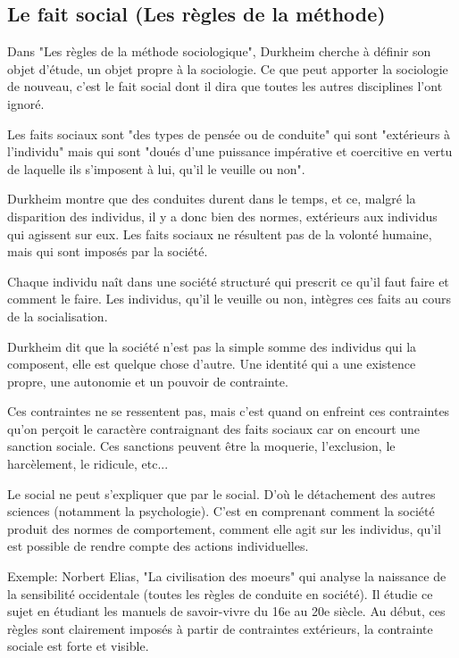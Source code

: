 \documentclass[10pt, a4paper, openany]{book}
\begin{document}
\subsection{Le fait social (Les règles de la méthode)}
Dans "Les règles de la méthode sociologique", Durkheim cherche à définir son objet d'étude, un objet propre à la sociologie. Ce que peut apporter la sociologie de nouveau, c'est le fait social dont il dira que toutes les autres disciplines l'ont ignoré.

Les faits sociaux sont "des types de pensée ou de conduite" qui sont "extérieurs à l'individu" mais qui sont "doués d'une puissance impérative et coercitive en vertu de laquelle ils s'imposent à lui, qu'il le veuille ou non".

Durkheim montre que des conduites durent dans le temps, et ce, malgré la disparition des individus, il y a donc bien des normes, extérieurs aux individus qui agissent sur eux. Les faits sociaux ne résultent pas de la volonté humaine, mais qui sont imposés par la société.

Chaque individu naît dans une société structuré qui prescrit ce qu'il faut faire et comment le faire. Les individus, qu'il le veuille ou non, intègres ces faits au cours de la socialisation. 

Durkheim dit que la société n'est pas la simple somme des individus qui la composent, elle est quelque chose d'autre. Une identité qui a une existence propre, une autonomie et un pouvoir de contrainte.

Ces contraintes ne se ressentent pas, mais c'est quand on enfreint ces contraintes qu'on perçoit le caractère contraignant des faits sociaux car on encourt une sanction sociale. Ces sanctions peuvent être la moquerie, l'exclusion, le harcèlement, le ridicule, etc...

Le social ne peut s'expliquer que par le social. D'où le détachement des autres sciences (notamment la psychologie). C'est en comprenant comment la société produit des normes de comportement, comment elle agit sur les individus, qu'il est possible de rendre compte des actions individuelles.

Exemple: Norbert Elias, "La civilisation des moeurs" qui analyse la naissance de la sensibilité occidentale (toutes les règles de conduite en société). Il étudie ce sujet en étudiant les manuels de savoir-vivre du 16e au 20e siècle. Au début, ces règles sont clairement imposés à partir de contraintes extérieurs, la contrainte sociale est forte et visible.
\end{document}
